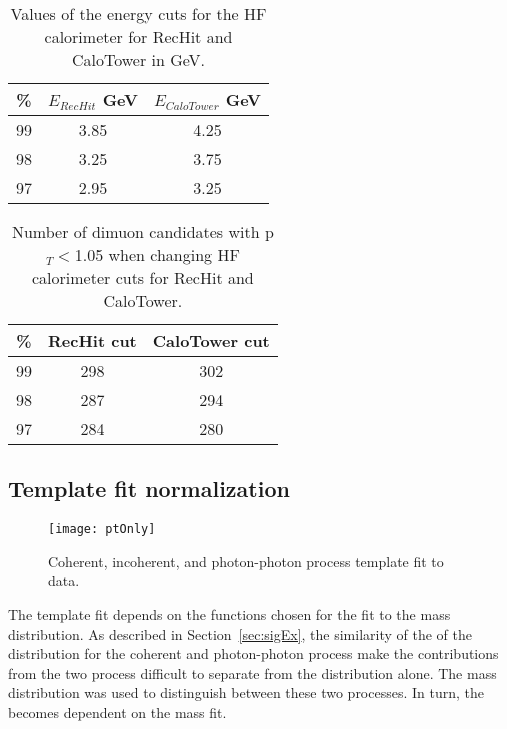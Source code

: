       \begin{table}[!Hhbt]
        \begin{center}
          \caption{Values of the energy cuts for the HF calorimeter for RecHit and CaloTower in GeV.}
          \label{tab:hfAdjustedThresholds}
          \begin{tabular}{|c|c|c|} \hline
            \% &  $E_{RecHit}$ GeV & $E_{CaloTower}$ GeV\\ 
            \hline
            99 & 3.85& 4.25 \\ \hline
            98 & 3.25& 3.75 \\ \hline
            97 & 2.95& 3.25 \\  \hline
           \end{tabular}
         \end{center}
      \end{table}

      \begin{table}[!Hhbt]
        \begin{center}
          \caption{Number of dimuon candidates with  p$_{T} <$1.05 when changing HF calorimeter cuts for RecHit and CaloTower.}
          \label{tab:hfAdjThreshYields}
          \begin{tabular}{|c|c|c|} \hline
            \% &  RecHit cut & CaloTower cut\\ \hline
            99 &   298 & 302 \\ \hline
            98 &  287  & 294 \\ \hline
            97 & 284 & 280 \\ \hline
          \end{tabular}
        \end{center}
      \end{table}


    \subsection{Template fit normalization}
      \begin{figure}[!Hhtb]
        \centering
        \texttt{[image: ptOnly]}
        \caption{Coherent, incoherent, and photon-photon process \pt{} template fit to data.}
        \label{fig:ptTempFit}
      \end{figure}
     
      The \pt{} template fit depends on the functions chosen for the fit
        to the mass distribution.
      As described in Section~\ref{sec:sigEx}, the similarity of the of the 
        \pt{} distribution for the coherent and photon-photon process make
        the contributions from the two process difficult to separate from the 
        \pt{} distribution alone.
      The mass distribution was used to distinguish between these two processes.
      In turn, the \pt{} becomes dependent on the mass fit. 

